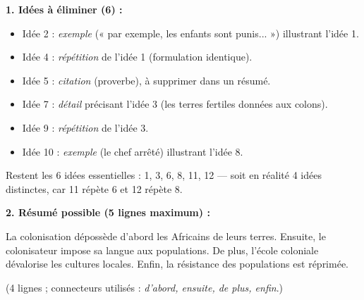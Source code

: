 \documentclass[11pt]{article}
\begin{document}
\begin{corrige}
\textbf{1. Idées à éliminer (6) :}
\begin{itemize}
\item Idée 2 : \emph{exemple} (« par exemple, les enfants sont punis... ») illustrant l'idée 1.
\item Idée 4 : \emph{répétition} de l'idée 1 (formulation identique).
\item Idée 5 : \emph{citation} (proverbe), à supprimer dans un résumé.
\item Idée 7 : \emph{détail} précisant l'idée 3 (les terres fertiles données aux colons).
\item Idée 9 : \emph{répétition} de l'idée 3.
\item Idée 10 : \emph{exemple} (le chef arrêté) illustrant l'idée 8.
\end{itemize}
Restent les 6 idées essentielles : 1, 3, 6, 8, 11, 12 — soit en réalité 4 idées distinctes, car 11 répète 6 et 12 répète 8.

\textbf{2. Résumé possible (5 lignes maximum) :}

La colonisation dépossède d'abord les Africains de leurs terres. Ensuite, le colonisateur impose sa langue aux populations. De plus, l'école coloniale dévalorise les cultures locales. Enfin, la résistance des populations est réprimée.

(4 lignes ; connecteurs utilisés : \emph{d'abord, ensuite, de plus, enfin}.)
\end{corrige}
\end{document}
